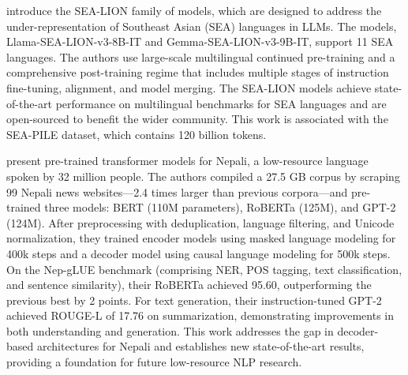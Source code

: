\documentclass[acmsmall]{acmart}
\begin{document}
\citep{ng2025sealionsoutheastasianlanguages} introduce the SEA-LION family of models, which are designed to address the under-representation of Southeast Asian (SEA) languages in LLMs. The models, Llama-SEA-LION-v3-8B-IT and Gemma-SEA-LION-v3-9B-IT, support 11 SEA languages. The authors use large-scale multilingual continued pre-training and a comprehensive post-training regime that includes multiple stages of instruction fine-tuning, alignment, and model merging. The SEA-LION models achieve state-of-the-art performance on multilingual benchmarks for SEA languages and are open-sourced to benefit the wider community. This work is associated with the SEA-PILE dataset, which contains 120 billion tokens.

 \citep{thapa2025developmentpretrainedtransformerbasedmodels} present pre-trained transformer models for Nepali, a low-resource language spoken by 32 million people. The authors compiled a 27.5 GB corpus by scraping 99 Nepali news websites—2.4 times larger than previous corpora—and pre-trained three models: BERT (110M parameters), RoBERTa (125M), and GPT-2 (124M). After preprocessing with deduplication, language filtering, and Unicode normalization, they trained encoder models using masked language modeling for 400k steps and a decoder model using causal language modeling for 500k steps. On the Nep-gLUE benchmark (comprising NER, POS tagging, text classification, and sentence similarity), their RoBERTa achieved 95.60, outperforming the previous best by 2 points. For text generation, their instruction-tuned GPT-2 achieved ROUGE-L of 17.76 on summarization, demonstrating improvements in both understanding and generation. This work addresses the gap in decoder-based architectures for Nepali and establishes new state-of-the-art results, providing a foundation for future low-resource NLP research.
\end{document}
